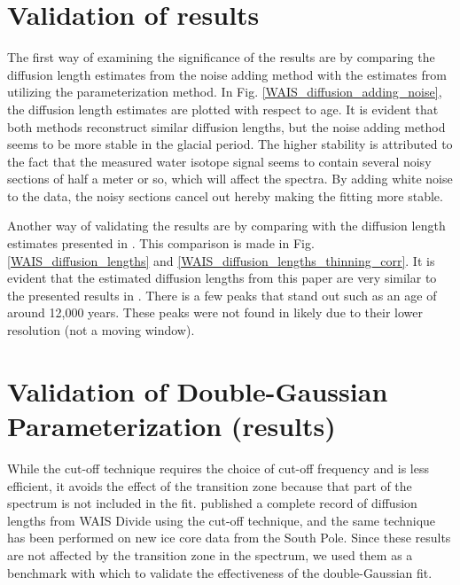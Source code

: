 \documentclass[draft, jgrga]{AGUTeX}
\begin{document}
\begin{article}
\section{Validation of results}
The first way of examining the significance of the results are by comparing the diffusion length estimates from the
noise adding method with the estimates from utilizing the parameterization method.
In Fig. \ref{WAIS_diffusion_adding_noise}, the diffusion length estimates are plotted with respect to age.
It is evident that both methods reconstruct similar diffusion lengths, but the noise adding method seems to be
more stable in the glacial period. The higher stability is attributed to the fact that the measured water isotope signal
seems to contain several noisy sections of half a meter or so, which will affect the spectra.
By adding white noise to the data, the noisy sections cancel out hereby making the fitting more stable.

Another way of validating the results are by comparing with the diffusion length estimates presented in \cite{Jones2016}.
This comparison is made in Fig. \ref{WAIS_diffusion_lengths} and \ref{WAIS_diffusion_lengths_thinning_corr}.
It is evident that the estimated diffusion lengths from this paper are very similar to the presented results in \cite{Jones2016}.
There is a few peaks that stand out such as an age of around 12,000 years. These peaks were not found in \cite{Jones2016} likely due
to their lower resolution (not a moving window).




\section{Validation of Double-Gaussian Parameterization (results)}

While the cut-off technique requires the choice of cut-off frequency and is less efficient, it avoids the effect of the transition zone because that part of the spectrum is not included in the fit. \citet{Jones2016} published a complete record of diffusion lengths from WAIS Divide using the cut-off technique, and the same technique has been performed on new ice core data from the South Pole. Since these results are not affected by the transition zone in the spectrum, we used them as a benchmark with which to validate the effectiveness of the double-Gaussian fit.


\end{article}
\end{document}

